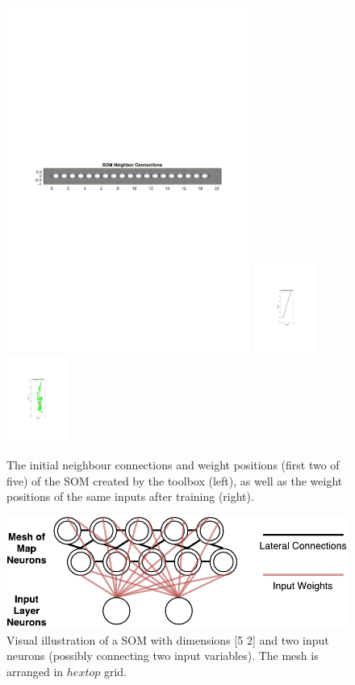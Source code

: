 \documentclass[10pt, oneside]{article}
\begin{document}
\begin{figure}[h]
\begin{center}
\includegraphics[width=8cm]{somnc.pdf} \includegraphics[width=2.07cm]{sompos.pdf} \includegraphics[width=2cm]{sompos-aftertraining.pdf}
\end{center}
\caption{\label{fig:som-init} The initial neighbour connections and weight positions (first two of five) of the SOM created by the toolbox (left), as well as the weight positions of the same inputs after training (right).}
\end{figure}

\begin{figure}[h]
\begin{center}
\includegraphics[width=12cm]{som-visual.pdf} 
\end{center}
\caption{\label{fig:som-visual} Visual illustration of a SOM with dimensions [5 2] and two input neurons (possibly connecting two input variables). The mesh is arranged in $hextop$ grid.}
\end{figure}
\end{document}
